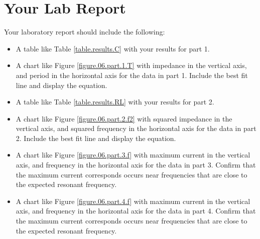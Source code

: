 \section{Your Lab Report}
%
Your laboratory report should include the following:
\begin{itemize}
	\item A table like Table \ref{table.results.C} with your results for part 1.
	\item A chart like Figure \ref{figure.06.part.1.T} with impedance in the vertical axis, and period in the horizontal axis for the data in part 1. Include the best fit line and display the equation.
	\item A table like Table \ref{table.results.RL} with your results for part 2.
	\item A chart like Figure \ref{figure.06.part.2.f2} with squared impedance in the vertical axis, and squared frequency in the horizontal axis for the data in part 2. Include the best fit line and display the equation.
	\item A chart like Figure \ref{figure.06.part.3.f} with maximum current in the vertical axis, and frequency in the horizontal axis for the data in part 3. Confirm that the maximum current corresponds occurs near frequencies that are close to the expected resonant frequency.
	\item A chart like Figure \ref{figure.06.part.4.f} with maximum current in the vertical axis, and frequency in the horizontal axis for the data in part 4. Confirm that the maximum current corresponds occurs near frequencies that are close to the expected resonant frequency.
\end{itemize}
%
\newpage
